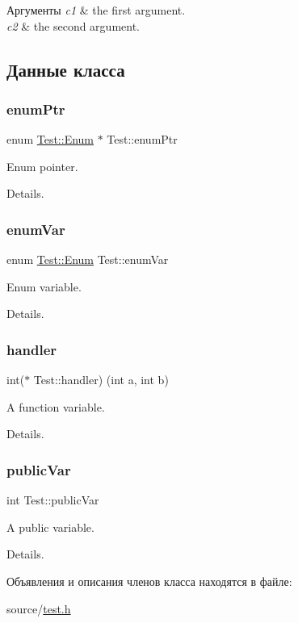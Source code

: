 \begin{DoxyParams}{Аргументы}
{\em c1} & the first argument. \\
\hline
{\em c2} & the second argument. \\
\hline
\end{DoxyParams}


\subsection{Данные класса}
\hypertarget{class_test_aa227d847bbcc907bde488c4389458fb5}{}\label{class_test_aa227d847bbcc907bde488c4389458fb5} 
\subsubsection{\texorpdfstring{enum\+Ptr}{enumPtr}}
{\footnotesize\ttfamily enum \hyperlink{class_test_add48b50526c27bcdb96b828ddfaaf648}{Test\+::\+Enum}
         $\ast$ Test\+::enum\+Ptr}



Enum pointer. 

Details. \hypertarget{class_test_acddf2c0544e1b3d1475142eb28589b2c}{}\label{class_test_acddf2c0544e1b3d1475142eb28589b2c} 
\subsubsection{\texorpdfstring{enum\+Var}{enumVar}}
{\footnotesize\ttfamily enum \hyperlink{class_test_add48b50526c27bcdb96b828ddfaaf648}{Test\+::\+Enum}
          Test\+::enum\+Var}



Enum variable. 

Details. \hypertarget{class_test_ad596b3dbeefd2b62620ee18c8d06cece}{}\label{class_test_ad596b3dbeefd2b62620ee18c8d06cece} 
\subsubsection{\texorpdfstring{handler}{handler}}
{\footnotesize\ttfamily int($\ast$ Test\+::handler) (int a, int b)}



A function variable. 

Details. \hypertarget{class_test_a3085f973ef857d85d647bf04e89760d0}{}\label{class_test_a3085f973ef857d85d647bf04e89760d0} 
\subsubsection{\texorpdfstring{public\+Var}{publicVar}}
{\footnotesize\ttfamily int Test\+::public\+Var}



A public variable. 

Details. 

Объявления и описания членов класса находятся в файле\+:\begin{DoxyCompactItemize}
\item 
source/\hyperlink{test_8h}{test.\+h}\end{DoxyCompactItemize}
